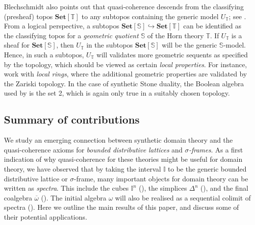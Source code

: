 \documentclass[a4paper,12pt]{amsart}
\theoremstyle{definition}
\newcommand{\mb}[1]{\mathbf{#1}}
\newcommand{\mbb}[1]{\mathbb{#1}}
\newcommand{\T}{\mbb T}
\newcommand{\I}{\mbb I}
\newcommand{\Set}{\mb{Set}}
\newcommand{\ov}[1]{\overline{#1}}
\newcommand{\hook}{\hookrightarrow}
\begin{document}
Blechschmidt also points out that quasi-coherence descends from the classifying (presheaf) topos $\Set[\T]$ to any subtopos containing the generic model $U_\T$; see \citet[Cor. 7.7]{blechschmidt2020general}. From a logical perspective, a subtopos $\Set[\mbb S] \hook \Set[\T]$ can be identified as the classifying topos for a \emph{geometric quotient} $\mbb S$ of the Horn theory $\T$. If $U_\T$ is a sheaf for $\Set[\mbb S]$, then $U_\T$ in the subtopos $\Set[\mbb S]$ will be the generic $\mbb S$-model.
Hence, in such a subtopos, $U_\T$ will validates more geometric sequents as specified by the topology, which should be viewed as certain \emph{local properties}. For instance, \citet{blechschmidt2021using,Cherubini_Coquand_Hutzler_2024} work with \emph{local rings}, where the additional geometric properties are validated by the Zariski topology.
In the case of synthetic Stone duality, the Boolean algebra used by \citet{cherubini2024foundation} is the set 2, which is again only true in a suitably chosen topology.


\subsection{Summary of contributions}\label{sec:contributions}

We study an emerging connection between synthetic domain theory and the quasi-coherence axioms for \emph{bounded distributive lattices} and \emph{$\sigma$-frames}. As a first indication of why quasi-coherence for these theories might be useful for domain theory, we have observed that by taking the interval $\I$ to be the generic bounded distributive lattice or $\sigma$-frame, many important objects for domain theory can be written as \emph{spectra}. This include the cubes $\I^n$ (), the simplices $\Delta^n$ (), and the final coalgebra $\ov\omega$ (). The initial algebra $\omega$ will also be realised as a sequential colimit of spectra (). Here we outline the main results of this paper, and discuss some of their potential applications.
\end{document}
